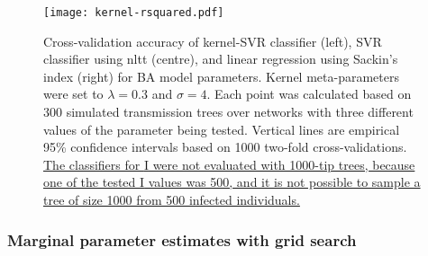 \begin{figure}[ht]
  \centering
  \texttt{[image: kernel-rsquared.pdf]}
  \caption[Cross-validation accuracy of kernel-SVR, nLTT-based SVR, and
  Sackin's index regression classifiers for BA model parameters.]{
      Cross-validation accuracy of kernel-SVR classifier (left), SVR classifier
      using \gls{nltt} (centre), and linear regression using Sackin's index
      (right) for \gls{BA} model parameters. Kernel meta-parameters were set to
      $\lambda = 0.3$ and $\sigma = 4$. Each point was calculated based on 300
      simulated transmission trees over networks with three different values of
      the parameter being tested. Vertical lines are empirical 95\% confidence
      intervals based on 1000 two-fold cross-validations. {\color{blue}\uline{
      The classifiers for \gls{I} were not evaluated with 1000-tip trees,
      because one of the tested \gls{I} values was 500, and it is not possible
      to sample a tree of size 1000 from 500 infected individuals.}}
  }
  \label{fig:rsquared}
\end{figure}

\subsubsection*{Marginal parameter estimates with grid search}













